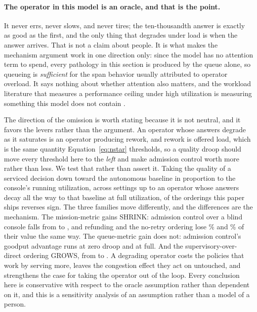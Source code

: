 \documentclass[11pt]{article}
\begin{document}
\paragraph{The operator in this model is an oracle, and that is the point.} It never errs, never slows, and never tires; the ten-thousandth answer is exactly as good as the first, and the only thing that degrades under load is when the answer arrives. That is not a claim about people. It is what makes the mechanism argument work in one direction only: since the model has no attention term to spend, every pathology in this section is produced by the queue alone, so queueing is \emph{sufficient} for the span behavior usually attributed to operator overload. It says nothing about whether attention also matters, and the workload literature that measures a performance ceiling under high utilization is measuring something this model does not contain \citep{cummings2008predicting,schneider2011workload}.

The direction of the omission is worth stating because it is not neutral, and it favors the levers rather than the argument. An operator whose answers degrade as it saturates is an operator producing rework, and rework is offered load, which is the same quantity Equation~\ref{eq:nstar} thresholds, so a quality droop should move every threshold here to the \emph{left} and make admission control worth more rather than less. We test that rather than assert it. Taking the quality of a serviced decision down toward the autonomous baseline in proportion to the console's running utilization, across \drLevels{} settings up to an operator whose answers decay all the way to that baseline at full utilization, \drVerdict{} of the \drChecked{} orderings this paper ships reverses sign. The three families move differently, and the differences are the mechanism. The mission-metric gains SHRINK: admission control over a blind console falls from \drAdmitSuccZero{} to \drAdmitSuccFull{}, and refunding and the no-retry ordering lose \drRefundSuccShrink\% and \drNoRetryShrink\% of their value the same way. The queue-metric gain does not: admission control's goodput advantage runs \drAdmitGoodZero{} at zero droop and \drAdmitGoodFull{} at full. And the supervisory-over-direct ordering GROWS, from \drSupOverDirZero{} to \drSupOverDirFull{}. A degrading operator costs the policies that work by serving more, leaves the congestion effect they act on untouched, and strengthens the case for taking the operator out of the loop. Every conclusion here is conservative with respect to the oracle assumption rather than dependent on it, and this is a sensitivity analysis of an assumption rather than a model of a person.
\end{document}
